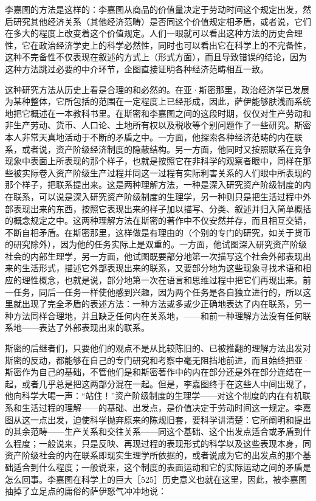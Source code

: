 李嘉图的方法是这样的：李嘉图从商品的价值量决定于劳动时间这个规定出发，然后研究其他经济关系（其他经济范畴）是否同这个价值规定相矛盾，或者说，它们在多大的程度上改变着这个价值规定。人们一眼就可以看出这种方法的历史合理性，它在政治经济学史上的科学必然性，同时也可以看出它在科学上的不完备性，这种不完备性不仅表现在叙述的方式上（形式方面），而且导致错误的结论，因为这种方法跳过必要的中介环节，企图直接证明各种经济范畴相互一致。

这种研究方法从历史上看是合理的和必然的。在亚·斯密那里，政治经济学已发展为某种整体，它所包括的范围在一定程度上已经形成，因此，萨伊能够肤浅而系统地把它概述在一本教科书里。在斯密和李嘉图之间的这段时期，仅仅对生产劳动和非生产劳动、货币、人口论、土地所有权以及税收等个别问题作了一些研究。斯密本人非常天真地活动于不断的矛盾之中。一方面，他探索各种经济范畴的内在联系，或者说，资产阶级经济制度的隐蔽结构。另一方面，他同时又按照联系在竞争现象中表面上所表现的那个样子，也就是按照它在非科学的观察者眼中，同样在那些被实际卷入资产阶级生产过程并同这一过程有实际利害关系的人们眼中所表现的那个样子，把联系提出来。这是两种理解方法，一种是深入研究资产阶级制度的内在联系，可以说是深入研究资产阶级制度的生理学，另一种则只是把生活过程中外部表现出来的东西，按照它表现出来的样子加以描写、分类、叙述并归入简单概括的概念规定之中。这两种理解方法在斯密的著作中不仅安然并存，而且相互交错，不断自相矛盾。在斯密那里，这样做是有理由的（个别的专门的研究，如关于货币的研究除外），因为他的任务实际上是双重的。一方面，他试图深入研究资产阶级社会的内部生理学，另一方面，他试图既要部分地第一次描写这个社会外部表现出来的生活形式，描述它外部表现出来的联系，又要部分地为这些现象寻找术语和相应的理性概念，也就是说，部分地第一次在语言和思维过程中把它们再现出来。前一任务，同后一任务一样使他感到兴趣，因为两个任务是各自独立进行的，所以这里就出现了完全矛盾的表述方法：一种方法或多或少正确地表达了内在联系，另一种方法同样合理地，并且缺乏任何内在关系地，——和前一种理解方法没有任何联系地——表达了外部表现出来的联系。

斯密的后继者们，只要他们的观点不是从比较陈旧的、已被推翻的理解方法出发对斯密的反动，都能够在自己的专门研究和考察中毫无阻挡地前进，而且始终把亚·斯密作为自己的基础，不管他们是和斯密著作中的内在部分还是外在部分连结在一起，或者几乎总是把这两部分混在一起。但是，李嘉图终于在这些人中间出现了，他向科学大喝一声：“站住！”资产阶级制度的生理学——对这个制度的内在有机联系和生活过程的理解——的基础、出发点，是价值决定于劳动时间这一规定。李嘉图从这一点出发，迫使科学抛弃原来的陈规旧套，要科学讲清楚：它所阐明和提出的其余范畴——生产关系和交往关系——同这个基础、这个出发点适合或矛盾到什么程度；一般说来，只是反映、再现过程的表现形式的科学以及这些表现本身，同资产阶级社会的内在联系即现实生理学所依据的，或者说成为它的出发点的那个基础适合到什么程度；一般说来，这个制度的表面运动和它的实际运动之间的矛盾是怎么回事。李嘉图在科学上的巨大［525］历史意义也就在这里，因此，被李嘉图抽掉了立足点的庸俗的萨伊怒气冲冲地说：

